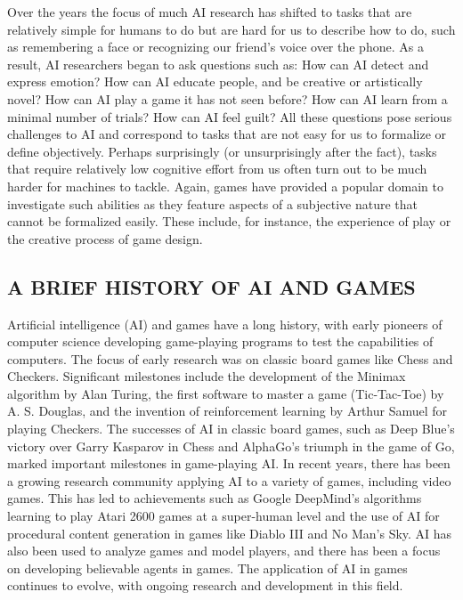 \documentclass{article}
\begin{document}
Over the years the focus of much AI research has shifted to tasks that are relatively simple for humans to do but are hard for us to describe how to do, such as remembering a face or recognizing our friend’s voice over the phone. As a result, AI researchers began to ask questions such as: How can AI detect and express emotion? How can AI educate people, and be creative or artistically novel? How can AI play a game it has not seen before? How can AI learn from a minimal number of trials? How can AI feel guilt? All these questions pose serious challenges to AI and correspond
to tasks that are not easy for us to formalize or define objectively. Perhaps surprisingly (or unsurprisingly after the fact), tasks that require relatively low cognitive effort from us often turn out to be much harder for machines to tackle. Again, games have provided a popular domain to investigate such abilities as they feature aspects of a subjective nature that cannot be formalized easily. These include, for
instance, the experience of play or the creative process of game design\cite{schell2008art}.

\subsection{A BRIEF HISTORY OF AI AND GAMES}

Artificial intelligence (AI) and games have a long history, with early pioneers of computer science developing game-playing programs to test the capabilities of computers. The focus of early research was on classic board games like Chess and Checkers. Significant milestones include the development of the Minimax algorithm by Alan Turing, the first software to master a game (Tic-Tac-Toe) by A. S. Douglas, and the invention of reinforcement learning by Arthur Samuel for playing Checkers. The successes of AI in classic board games, such as Deep Blue's victory over Garry Kasparov in Chess and AlphaGo's triumph in the game of Go, marked important milestones in game-playing AI. In recent years, there has been a growing research community applying AI to a variety of games, including video games. This has led to achievements such as Google DeepMind's algorithms learning to play Atari 2600 games at a super-human level and the use of AI for procedural content generation in games like Diablo III and No Man’s Sky. AI has also been used to analyze games and model players, and there has been a focus on developing believable agents in games. The application of AI in games continues to evolve, with ongoing research and development in this field\cite{yannakakis2018artificial}.
\end{document}
